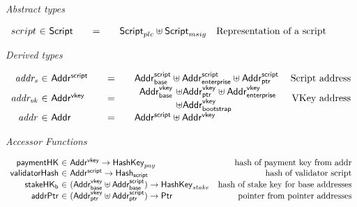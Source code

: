 \documentclass[11pt,a4paper,dvipsnames]{article}
\newcommand{\Addr}{\type{Addr}}
\newcommand{\AddrVKey}{\type{Addr^{vkey}}}
\newcommand{\AddrVKeyB}{\type{Addr^{vkey}_{base}}}
\newcommand{\AddrVKeyP}{\type{Addr^{vkey}_{ptr}}}
\newcommand{\AddrVKeyE}{\type{Addr^{vkey}_{enterprise}}}
\newcommand{\AddrVKeyBS}{\type{Addr^{vkey}_{bootstrap}}}
\newcommand{\AddrScr}{\type{Addr^{script}}}
\newcommand{\AddrScrBase}{\type{Addr_{base}^{script}}}
\newcommand{\AddrScrEnterprise}{\type{Addr_{enterprise}^{script}}}
\newcommand{\AddrScrPtr}{\type{Addr_{ptr}^{script}}}
\newcommand{\HashScr}{\type{Hash_{script}}}
\newcommand{\Ptr}{\type{Ptr}}
\newcommand{\Script}{\type{Script}}
\newcommand{\ScriptPlutus}{\Script_{plc}}
\newcommand{\ScriptMSig}{\Script_{msig}}
\newcommand{\HashKey}{\type{HashKey}}
\theoremstyle{definition}
\begin{document}
\begin{figure*}[hbt]
  \emph{Abstract types}

  \begin{equation*}
    \begin{array}{r@{~\in~}l@{\qquad=\qquad}lr}
      script & \Script & \ScriptPlutus\uniondistinct\ScriptMSig  & \text{Representation of a script}
    \end{array}
  \end{equation*}

  \emph{Derived types}

  \begin{equation*}
    \begin{array}{r@{~\in~}l@{\qquad=\qquad}lr}
      \var{addr_{s}} & \AddrScr & \AddrScrBase \uniondistinct \AddrScrEnterprise
                              \uniondistinct \AddrScrPtr & \text{Script address} \\
      \var{addr_{vk}} & \AddrVKey & \begin{array}{l@{~\uniondistinct}l}
                             \AddrVKeyB & \AddrVKeyP \uniondistinct \AddrVKeyE \\
                                    & \AddrVKeyBS
                           \end{array}
                                & \text{VKey address}\\
      \var{addr} & \Addr & \AddrScr \uniondistinct \AddrVKey
    \end{array}
  \end{equation*}

  \emph{Accessor Functions}

  \begin{equation*}
    \begin{array}{r@{~\in~}lr}
      \fun{paymentHK} & \AddrVKey \to \HashKey_{pay}
      & \text{hash of payment key from addr}\\
      \fun{validatorHash} & \AddrScr \to \HashScr & \text{hash of validator
                                                     script} \\
      \fun{stakeHK_{b}} & (\AddrVKeyB \uniondistinct \AddrScrBase) \to
                          \HashKey_{stake} & \text{hash of stake key for base
                                             addresses}\\
      \fun{addrPtr} & (\AddrVKeyP \uniondistinct \AddrScrPtr) \to \Ptr &
                                                                     \text{pointer
                                                                     from
                                                                     pointer addresses}
    \end{array}
  \end{equation*}


\end{figure*}
\end{document}
